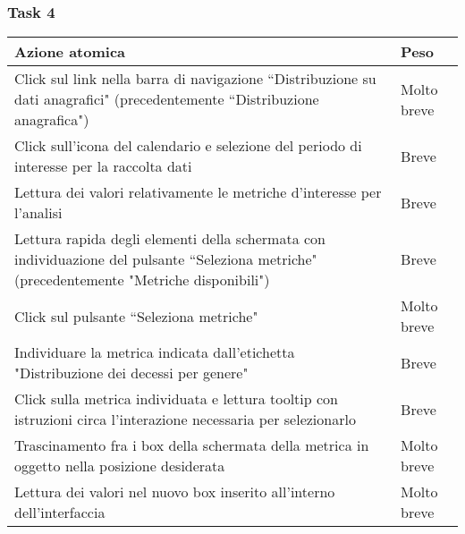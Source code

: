 \subsubsection{Task 4}
\label{sss:iaa-task-4}

{
\renewcommand{\arraystretch}{2}
\begin{longtable}[h]{| p{14cm} | p{2.5cm} |}
    \hline
    \textbf{Azione atomica} & \textbf{Peso} \\
    \hline
    \endhead
    Click sul link nella barra di navigazione ``Distribuzione su dati anagrafici" (precedentemente ``Distribuzione anagrafica") & Molto breve \\
    \hline
    Click sull'icona del calendario e selezione del periodo di interesse per la raccolta dati & Breve \\
    \hline
    Lettura dei valori relativamente le metriche d'interesse per l'analisi & Breve \\
    \hline
    Lettura rapida degli elementi della schermata con individuazione del pulsante ``Seleziona metriche" (precedentemente "Metriche disponibili") & Breve \\
    \hline
    Click sul pulsante ``Seleziona metriche" & Molto breve \\
    \hline
    Individuare la metrica indicata dall'etichetta "Distribuzione dei decessi per genere" & Breve \\
    \hline
    Click sulla metrica individuata e lettura tooltip con istruzioni circa l'interazione necessaria per selezionarlo & Breve \\
    \hline
    Trascinamento fra i box della schermata della metrica in oggetto nella posizione desiderata & Molto breve \\
    \hline
    Lettura dei valori nel nuovo box inserito all'interno dell'interfaccia & Molto breve \\
    \hline
\end{longtable}
}

